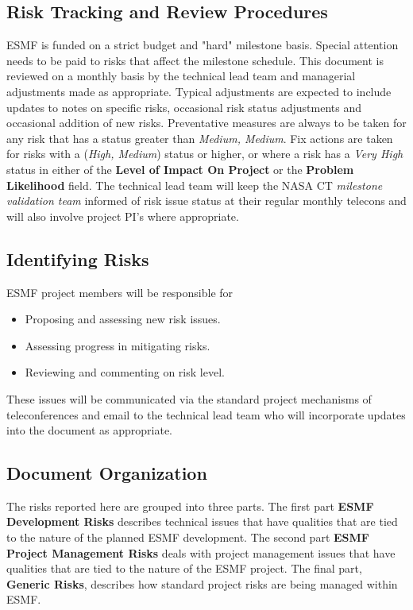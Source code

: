 \documentclass[english]{article}
\begin{document}
\subsection{Risk Tracking and Review Procedures}
ESMF is funded on a strict budget and "hard" milestone basis. Special attention needs to be
paid to risks that affect the milestone schedule.
This document is reviewed on a monthly basis by the technical lead team and managerial adjustments
made as appropriate. Typical adjustments are expected to include updates to notes on specific risks,
occasional risk status adjustments and occasional addition of new risks.
Preventative measures are always to be taken for any risk that has a status greater than {\it Medium, Medium}.
Fix actions are taken for risks with a ({\it High, Medium}) status or higher, or where a risk
has a {\it Very High} status in either of the {\bf Level of Impact On Project} or the
{\bf Problem Likelihood} field.
The technical lead team will keep the NASA CT {\it milestone validation team} informed of 
risk issue status at their regular monthly telecons and will also involve project PI's where 
appropriate.

\subsection{Identifying Risks}
ESMF project members will be responsible for
\begin{itemize}
\item Proposing and assessing new risk issues.
\item Assessing progress in mitigating risks.
\item Reviewing and commenting on risk level.
\end{itemize}
These issues will be communicated via the standard 
project mechanisms of teleconferences and email to the technical lead team who will incorporate updates
into the document as appropriate.

\subsection{Document Organization}

The risks reported here are grouped into three parts. The first part {\bf ESMF Development Risks} describes
technical issues that have qualities that are tied to the nature of the planned ESMF development.
The second part {\bf ESMF Project Management Risks} deals with project management issues
that have qualities that are tied to the nature of the ESMF project. The final part, {\bf Generic Risks},
describes how standard project risks are being managed within ESMF.
\end{document}
